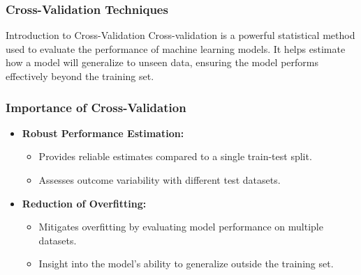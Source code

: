 \documentclass[aspectratio=169]{beamer}
\begin{document}
\begin{frame}[fragile]
    \frametitle{Cross-Validation Techniques}
    \begin{block}{Introduction to Cross-Validation}
        Cross-validation is a powerful statistical method used to evaluate the performance of machine learning models.
        It helps estimate how a model will generalize to unseen data, ensuring the model performs effectively beyond the training set.
    \end{block}
\end{frame}

\begin{frame}[fragile]
    \frametitle{Importance of Cross-Validation}
    \begin{itemize}
        \item \textbf{Robust Performance Estimation:}
        \begin{itemize}
            \item Provides reliable estimates compared to a single train-test split.
            \item Assesses outcome variability with different test datasets.
        \end{itemize}
        \item \textbf{Reduction of Overfitting:}
        \begin{itemize}
            \item Mitigates overfitting by evaluating model performance on multiple datasets.
            \item Insight into the model's ability to generalize outside the training set.
        \end{itemize}
    \end{itemize}
\end{frame}
\end{document}

